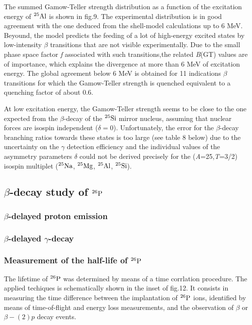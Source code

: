 \documentclass[UTF8]{ctexart}
\begin{document}
The summed Gamow-Teller strength distribution as a function of the excitation energy of $^{25}\textnormal{Al}$ is shown in fig.9. The experimental distribution is in good agreement with the one deduced from the shell-model calculations up to 6 MeV. Beyound, the model predicts the feeding of a lot of high-energy excited states by low-intensity $\beta$ transitions that are not visible experimentally. Due to the small phase space factor \textit{f} associated with such transitions,the related \textit{B}(GT) values are of importance, which explains the divergence at more than 6 MeV of excitation energy. The global agreement below 6 MeV is obtained for 11 indications $\beta$ transitions for which the Gamow-Teller strength is quenched equivalent to a quenching factor of about 0.6.

At low excitation energy, the Gamow-Teller strength seems to be close to the one expected from the $\beta$-decay of the $^{25}\textnormal{Si}$ mirror nucleus, assuming that nuclear forces are isospin independent ($\delta=0$). Unfortunately, the error for the $\beta$-decay branching ratios towards these states is too large (see table 8 below) due to the uncertainty on the $\gamma$ detection efficiency and the individual values of the asymmetry parameters $\delta$ could not be derived precisely for the (\textit{A}=25,\textit{T}=3/2) isospin multiplet ($^{25}\textnormal{Na}$, $^{25}\textnormal{Mg}$, $^{25}\textnormal{Al}$, $^{25}\textnormal{Si}$).
\subsection{$\beta$-decay study of $^{26}\textnormal{P}$}

\subsubsection{$\beta$-delayed proton emission}
\subsubsection{$\beta$-delayed $\gamma$-decay}
\subsubsection{Measurement of the half-life of $^{26}\textnormal{P}$}
The lifetime of $^{26}\textnormal{P}$ was determined by means of a time corrlation procedure. The applied techiques is schematically shown in the inset of fig.12. It consists in measuring the time difference between the implantation of $^{26}\textnormal{P}$ ions, identified by means of time-of-flight and energy loss measurements, and the observation of $\beta$ or $\beta-(2)p$ decay events.
\end{document}
